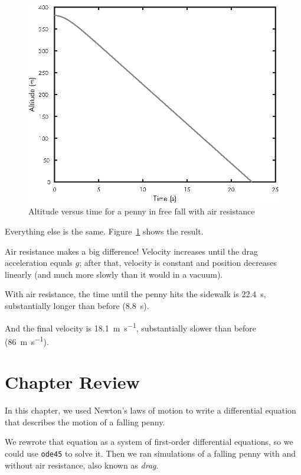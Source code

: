\begin{figure}[ht]
\includegraphics{book/images/figure11_02_new.eps}
\caption{Altitude versus time for a penny in free fall with air resistance}
\label{fig:penny2}
\end{figure}

Everything else is the same.  Figure~\ref{fig:penny2} shows the result. 

Air resistance makes a big difference! Velocity increases until
the drag acceleration equals $g$; after that, velocity is constant and position decreases linearly (and much more slowly than it would in a vacuum).

With air resistance, the time until the penny hits the sidewalk is \SI{22.4}{\second}, substantially longer than before (\SI{8.8}{\second}).

And the final velocity is \SI{18.1}{\meter \per \second}, substantially slower than before (\SI{86}{\meter \per \second}).

\section{Chapter Review}

In this chapter, we used Newton's laws of motion to write a differential equation that describes the motion of a falling penny.  

We rewrote that equation as a system of first-order differential equations, so we could use \lstinline{ode45} to solve it.  Then we ran simulations of a falling penny with and without air resistance, also known as \emph{drag}.

